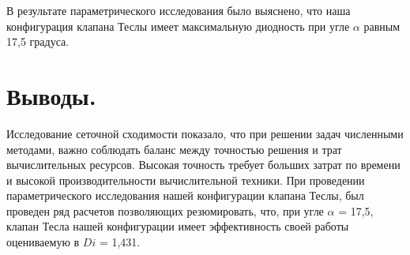 \documentclass[14pt,a4paper]{article}
\begin{document}
         В результате параметрического исследования было выяснено, что наша конфигурация клапана Теслы имеет максимальную диодность при угле $ \alpha $ равным 17,5 градуса. 
         
         \section*{Выводы.}
         
         Исследование сеточной сходимости показало, что при решении задач численными методами, важно соблюдать баланс между точностью решения и трат вычислительных ресурсов. Высокая точность требует больших затрат по времени и высокой производительности вычислительной техники. При проведении параметрического исследования нашей конфигурации клапана Теслы, был проведен ряд расчетов позволяющих резюмировать, что, при угле $\alpha$  = 17,5\textdegree, клапан Тесла нашей конфигурации имеет эффективность своей работы оцениваемую в $Di$ = 1,431.
         
         
         
                 
\end{document}
